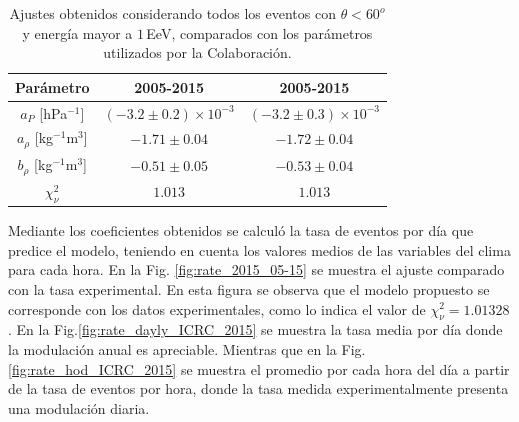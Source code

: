         \begin{table}[H]
            \centering
            \begin{tabular}{c|c|c}
            {Parámetro}                 & {2005-2015}                   & {2005-2015}    \cite{aab2017impact}              \\ \hline
            $a_P$ [hPa$^{-1}$]          & $(-3.2 \pm 0.2)\times 10^{-3}$& $(-3.2 \pm 0.3)\times 10^{-3}$    \\ \hline
            $a_\rho$ [kg$^{-1}$m$^3$]   & $-1.71 \pm 0.04 $             & $-1.72 \pm 0.04$                  \\ \hline
            $b_\rho$ [kg$^{-1}$m$^3$]   & $-0.51 \pm 0.05$              & $-0.53 \pm 0.04$                  \\ \hline
            $\chi^2_\nu$                & $1.013$                       & $1.013$                           \\ 
            \end{tabular} 
            \caption{Ajustes obtenidos considerando todos los eventos con $\theta<60^o$ y energía mayor a $1\,$EeV, comparados con los parámetros utilizados por la Colaboración.} \label{tabla:parametros_ICRC_2015}
        \end{table}

        Mediante los coeficientes obtenidos se calculó la tasa de eventos por día que predice el modelo, teniendo en cuenta los valores medios de las variables del clima para cada hora. En la Fig. \ref{fig:rate_2015_05-15} se muestra el ajuste comparado con la tasa experimental. En esta figura se observa que el modelo propuesto se corresponde con los datos experimentales, como lo indica el valor de $\chi^2_\nu=1.01328$. En la Fig.\ref{fig:rate_dayly_ICRC_2015} se muestra la tasa media por día donde la modulación anual es apreciable. Mientras que en la Fig.\ref{fig:rate_hod_ICRC_2015} se muestra el promedio por cada hora del día a partir de la tasa de eventos por hora, donde la tasa medida experimentalmente presenta una modulación diaria. 
        

